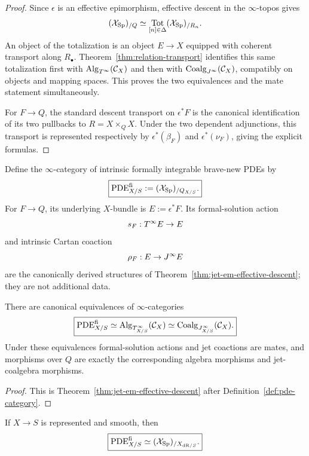 \begin{proof}
Since $\epsilon$ is an effective epimorphism, effective descent in the $\infty$-topos gives
\[
    (\mathcal{X}_{\mathrm{Sp}})_{/Q}
    \simeq
    \operatorname*{Tot}_{[n]\in\Delta}
    (\mathcal{X}_{\mathrm{Sp}})_{/R_n}.
\]
An object of the totalization is an object $E\to X$ equipped with coherent transport along $R_\bullet$.  Theorem~\ref{thm:relation-transport} identifies this same totalization first with $\operatorname{Alg}_{T^{\infty}}(\mathcal C_X)$ and then with $\operatorname{Coalg}_{J^{\infty}}(\mathcal C_X)$, compatibly on objects and mapping spaces.  This proves the two equivalences and the mate statement simultaneously.

For $F\to Q$, the standard descent transport on $\epsilon^*F$ is the canonical identification of its two pullbacks to $R=X\times_QX$.  Under the two dependent adjunctions, this transport is represented respectively by $\epsilon^*(\beta_F)$ and $\epsilon^*(\nu_F)$, giving the explicit formulas.
\end{proof}

\begin{definition}
\label{def:pde-category}
Define the $\infty$-category of intrinsic formally integrable brave-new PDEs by
\[
    \boxed{
    \operatorname{PDE}^{\mathrm{fi}}_{X/S}:=(\mathcal{X}_{\mathrm{Sp}})_{/Q_{X/S}}.
    }
\]
For $F\to Q$, its underlying $X$-bundle is $E:=\epsilon^*F$.  Its formal-solution action
\[
    s_F:T^{\infty} E\to E
\]
and intrinsic Cartan coaction
\[
    \rho_F:E\to J^{\infty} E
\]
are the canonically derived structures of Theorem~\ref{thm:jet-em-effective-descent}; they are not additional data.
\end{definition}

\begin{theorem}
\label{thm:pde-em-equivalence}
There are canonical equivalences of $\infty$-categories
\[
\boxed{
    \operatorname{PDE}^{\mathrm{fi}}_{X/S}
    \simeq
    \operatorname{Alg}_{T^{\infty}_{X/S}}(\mathcal C_X)
    \simeq
    \operatorname{Coalg}_{J^{\infty}_{X/S}}(\mathcal C_X).
}
\]
Under these equivalences formal-solution actions and jet coactions are mates, and morphisms over $Q$ are exactly the corresponding algebra morphisms and jet-coalgebra morphisms.
\end{theorem}

\begin{proof}
This is Theorem~\ref{thm:jet-em-effective-descent} after Definition~\ref{def:pde-category}.
\end{proof}

\begin{corollary}
\label{cor:pde-topos-smooth}
If $X\to S$ is represented and smooth, then
\[
    \boxed{
    \operatorname{PDE}^{\mathrm{fi}}_{X/S}
    \simeq
    (\mathcal{X}_{\mathrm{Sp}})_{/X_{\mathrm{dR}/S}}.
    }
\]
\end{corollary}

